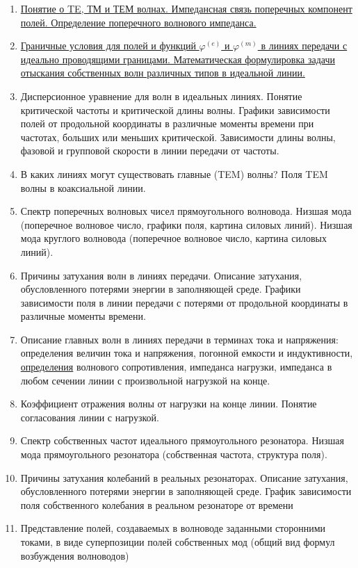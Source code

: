 \documentclass[a4paper,14pt]{extarticle}
\renewcommand{\phi}{\varphi}
\begin{document}
\begin{enumerate}
		\item 
		\hyperlink{num3}{Понятие о TE, ТМ и ТЕМ волнах. Импедансная связь поперечных компонент полей. Определение поперечного волнового импеданса.}
		\item
		\hyperlink{num4}{Граничные условия для полей и функций  $\phi^{(e)}$ и $\phi^{(m)}$ в линиях передачи с идеально	
		проводящими границами. Математическая формулировка задачи отыскания собственных волн различных типов в идеальной линии.}
		\item 
		Дисперсионное уравнение для волн в идеальных линиях. Понятие критической частоты и критической длины волны. Графики зависимости полей от продольной координаты в различные моменты времени при частотах, больших или меньших критической. Зависимости длины волны, фазовой и групповой скорости в линии передачи от частоты.
		\item
		В каких линиях могут существовать главные (TEM) волны? Поля TEM волны в	коаксиальной линии.
		\item 
		Спектр поперечных волновых чисел прямоугольного волновода. Низшая мода (поперечное волновое число, графики поля, картина силовых линий). Низшая мода круглого волновода (поперечное волновое число, картина силовых линий).
		\item
		Причины затухания волн в линиях передачи. Описание затухания, обусловленного потерями энергии в заполняющей среде. Графики зависимости поля в линии передачи с потерями от продольной координаты в различные моменты времени.
		\item 
		Описание главных волн в линиях передачи в терминах тока и напряжения: определения величин тока и напряжения, погонной емкости и индуктивности, \underline{определения} волнового сопротивления, импеданса нагрузки, импеданса в любом сечении линии с произвольной нагрузкой на конце.
		\item 
		Коэффициент отражения волны от нагрузки на конце линии. Понятие согласования линии с нагрузкой.
		\item 
		Спектр собственных частот идеального прямоугольного резонатора. Низшая мода прямоугольного резонатора (собственная частота, структура поля).
		\item 
		Причины затухания колебаний в реальных резонаторах. Описание затухания, обусловленного потерями энергии в заполняющей среде. График зависимости поля собственного колебания в реальном резонаторе от времени
		\item 
		Представление полей, создаваемых в волноводе заданными сторонними токами, в виде суперпозиции полей собственных мод (общий вид формул возбуждения волноводов)

\end{enumerate}
\end{document}
